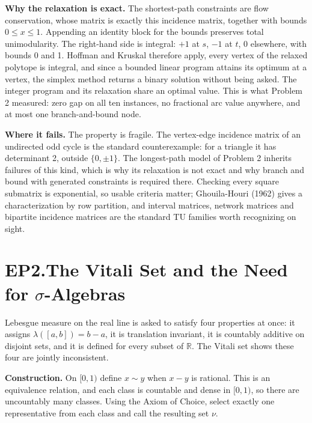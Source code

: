 \documentclass[11pt]{article}
\begin{document}
\textbf{Why the relaxation is exact.}\quad
The shortest-path constraints are flow conservation, whose matrix is
exactly this incidence matrix, together with bounds $0 \le x \le 1$.
Appending an identity block for the bounds preserves total
unimodularity. The right-hand side is integral: $+1$ at $s$, $-1$ at
$t$, 0 elsewhere, with bounds 0 and 1. Hoffman and Kruskal therefore
apply, every vertex of the relaxed polytope is integral, and since a
bounded linear program attains its optimum at a vertex, the simplex
method returns a binary solution without being asked. The integer
program and its relaxation share an optimal value. This is what
Problem 2 measured: zero gap on all ten instances, no fractional arc
value anywhere, and at most one branch-and-bound node.

\textbf{Where it fails.}\quad
The property is fragile. The vertex-edge incidence matrix of an
undirected odd cycle is the standard counterexample: for a triangle it
has determinant 2, outside $\{0, \pm 1\}$. The longest-path model of
Problem 2 inherits failures of this kind, which is why its relaxation is
not exact and why branch and bound with generated constraints is
required there. Checking every square submatrix is exponential, so
usable criteria matter; Ghouila-Houri (1962) gives a characterization by
row partition, and interval matrices, network matrices and bipartite
incidence matrices are the standard TU families worth recognizing on
sight.

\newpage
\section*{EP2.\quad The Vitali Set and the Need for $\sigma$-Algebras}

Lebesgue measure on the real line is asked to satisfy four properties at
once: it assigns $\lambda([a,b]) = b - a$, it is translation invariant,
it is countably additive on disjoint sets, and it is defined for every
subset of $\mathbb{R}$. The Vitali set shows these four are jointly
inconsistent.

\textbf{Construction.}\quad
On $[0,1)$ define $x \sim y$ when $x - y$ is rational. This is an
equivalence relation, and each class is countable and dense in $[0,1)$,
so there are uncountably many classes. Using the Axiom of Choice, select
exactly one representative from each class and call the resulting set
$\nu$.
\end{document}
